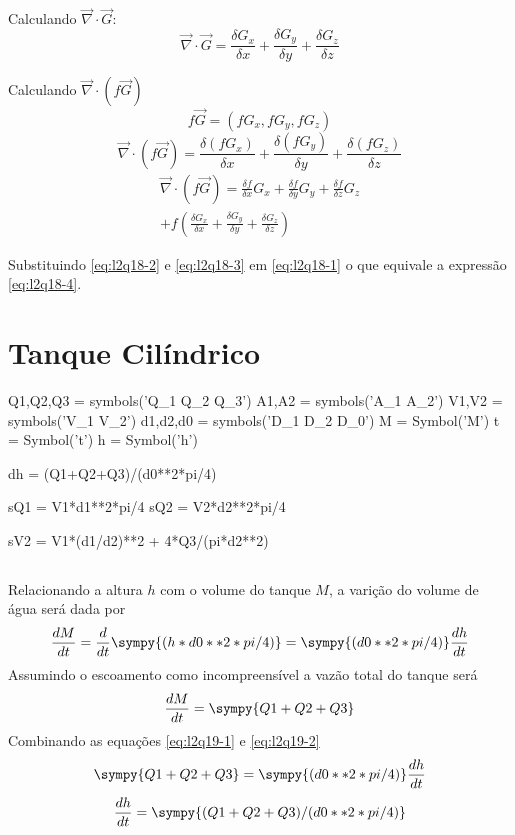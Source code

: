 \documentclass[a4paper,twocolumn,11pt]{article}
\begin{document}
Calculando $\vec{\nabla} \cdot \vec{G}$:
\begin{equation}\label{eq:l2q18-3}
\vec{\nabla} \cdot \vec{G}=\frac{\delta G_x}{\delta x} + \frac{\delta G_y}{\delta y} + \frac{\delta G_z}{\delta z}
\end{equation}

Calculando $\vec{\nabla} \cdot (f \vec{G})$
$$
f\vec{G} = (f G_x,f G_y,f G_z)
$$
$$
\vec{\nabla} \cdot (f \vec{G}) = \frac{\delta (f G_x)}{\delta x} + \frac{\delta (f G_y)}{\delta y} + \frac{\delta (f G_z)}{\delta z}
$$
\begin{multline}\label{eq:l2q18-4}
\vec{\nabla} \cdot (f \vec{G}) =  \frac{\delta f}{\delta x}G_x + \frac{\delta f}{\delta y}G_y + \frac{\delta f}{\delta z}G_z\\ + f\left( \frac{\delta G_x}{\delta x} + \frac{\delta G_y}{\delta y} + \frac{\delta G_z}{\delta z} \right)
\end{multline}

Substituindo \eqref{eq:l2q18-2} e \eqref{eq:l2q18-3} em \eqref{eq:l2q18-1} o que equivale a expressão \eqref{eq:l2q18-4}.

\section{Tanque Cilíndrico} %
\begin{sympycode}
Q1,Q2,Q3 = symbols('Q_1 Q_2 Q_3')
A1,A2 = symbols('A_1 A_2')
V1,V2 = symbols('V_1 V_2')
d1,d2,d0 = symbols('D_1 D_2 D_0')
M = Symbol('M')
t = Symbol('t')
h = Symbol('h')

dh = (Q1+Q2+Q3)/(d0**2*pi/4)

sQ1 = V1*d1**2*pi/4
sQ2 = V2*d2**2*pi/4

sV2 = V1*(d1/d2)**2 + 4*Q3/(pi*d2**2)
\end{sympycode}
\subsection{}
Relacionando a altura $h$ com o volume do tanque $M$, a varição do volume de água será dada por
\begin{equation}\label{eq:l2q19-1}
\frac{d M}{dt} = \frac{d}{dt}\sympy{(h * d0**2*pi/4)} = \sympy{(d0**2*pi/4)}\frac{d h}{dt}
\end{equation}
Assumindo o escoamento como incompreensível a vazão total do tanque será
\begin{equation}\label{eq:l2q19-2}
\frac{d M}{dt} = \sympy{Q1+Q2+Q3}
\end{equation}
Combinando as equações \eqref{eq:l2q19-1} e \eqref{eq:l2q19-2}
$$\sympy{Q1+Q2+Q3} = \sympy{(d0**2*pi/4)}\frac{d h}{dt}$$
\begin{equation}
\frac{d h}{dt} = \sympy{(Q1+Q2+Q3)/(d0**2*pi/4)}
\end{equation}
\end{document}
